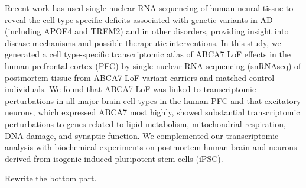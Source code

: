 Recent work has used single-nuclear RNA sequencing of human neural tissue to reveal the cell type specific deficits associated with genetic variants in AD (including APOE4 and TREM2) and in other disorders\cite{Brase2023-xk,Blanchard2022-cf,Sayed2021-qn,Wamsley2024-zm,Kamath2022-if}, providing insight into disease mechanisms and possible therapeutic interventions. In this study, we generated a cell type-specific transcriptomic atlas of ABCA7 LoF effects in the human prefrontal cortex (PFC) by single-nuclear RNA sequencing (snRNAseq) of postmortem tissue from ABCA7 LoF variant carriers and matched control individuals. We found that ABCA7 LoF was linked to transcriptomic perturbations in all major brain cell types in the human PFC and that excitatory neurons, which expressed ABCA7 most highly, showed substantial transcriptomic perturbations  to genes related to lipid metabolism, mitochondrial respiration, DNA damage, and synaptic function. We complemented our transcriptomic analysis with biochemical experiments on postmortem human brain and neurons derived from isogenic induced pluripotent stem cells (iPSC).

Rewrite the bottom part.


